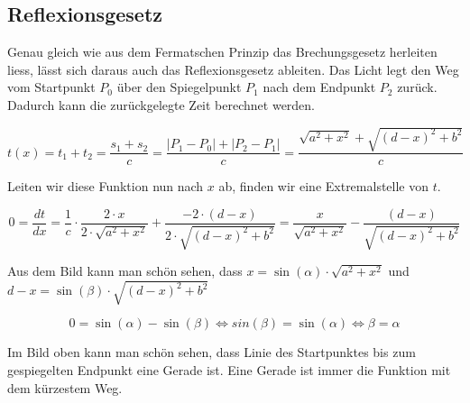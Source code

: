 \subsection{Reflexionsgesetz}
\cite{Wikipedia}Genau gleich wie aus dem Fermatschen Prinzip das Brechungsgesetz herleiten liess, 
lässt sich daraus auch das Reflexionsgesetz ableiten.
Das Licht legt den Weg vom Startpunkt $P_0$ über den Spiegelpunkt $P_1$ 
nach dem Endpunkt $P_2$ zurück. Dadurch kann die zurückgelegte Zeit berechnet werden.



\[
t(x) =
t_1 + t_2 =
\frac{s_1 + s_2}{c} =
\frac{|P_1 - P_0| + |P_2 - P_1|}{c} =
\frac{\sqrt{a^2 + x^2} + \sqrt{(d-x)^2 + b^2}}{c}
\]

Leiten wir diese Funktion nun nach $x$ ab, finden wir eine Extremalstelle von $t$.

\[
0 = 
\frac{dt}{dx} =
\frac{1}{c} \cdot
\frac{2 \cdot x}{2 \cdot \sqrt{a^2 + x^2}} + 
\frac{-2 \cdot (d-x)}{2 \cdot \sqrt{(d-x)^2 + b^2}} =
\frac{x}{ \sqrt{a^2 + x^2}} - 
\frac{(d-x)}{ \sqrt{(d-x)^2 + b^2}}
\]

Aus dem Bild kann man schön sehen, dass $x = \sin(\alpha) \cdot \sqrt{a^2 + x^2}$
und $d-x = \sin(\beta) \cdot \sqrt{(d -x)^2 + b^2}$

\[
0 = \sin(\alpha) - \sin(\beta) \Leftrightarrow
sin(\beta) = \sin(\alpha) \Leftrightarrow
\beta = \alpha
\]

Im Bild oben kann man schön sehen, dass Linie des Startpunktes bis zum 
gespiegelten Endpunkt eine Gerade ist. Eine Gerade ist immer die Funktion mit dem kürzestem Weg.




